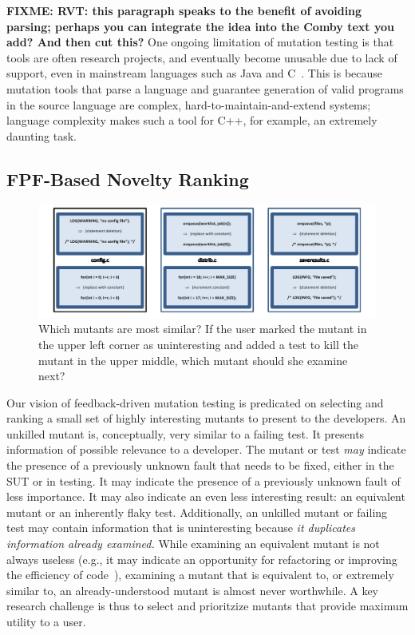 \textbf{FIXME: RVT: this paragraph speaks to the benefit of avoiding parsing;
  perhaps you can integrate the idea into the Comby text you add? And then cut this?} 
One ongoing limitation of mutation testing is that tools are often research
projects, and eventually become unusable due to lack of support, even in
mainstream languages such as Java and C~\cite{MutChoice}.
This is because mutation tools that parse a language and guarantee generation of
valid programs in the source language are complex, hard-to-maintain-and-extend
systems; language complexity makes such a tool for C++, for example, an
extremely daunting task.   

\subsection{FPF-Based Novelty Ranking}
\label{sec:fpfplan}

\begin{figure}[t]
\centering
\includegraphics[width=0.95\columnwidth]{distmetric}

\caption{Which mutants are most similar?  If the user marked the
  mutant in the upper left corner as uninteresting and added a test
  to kill the
  mutant in the upper middle, which mutant
  should she examine next?}
\label{fig:distances}
\end{figure}


Our vision of feedback-driven mutation testing is predicated on selecting and ranking a small
set of highly interesting mutants to present to the developers.  An unkilled
mutant is, conceptually, very similar to a failing test.  It presents
information of possible relevance to a developer.  The mutant or test \emph{may}
indicate the presence of a previously unknown fault that needs to be fixed,
either in the SUT or in testing.  It may indicate the presence of a previously
unknown fault of less importance.  It may also indicate an even less interesting
result: an equivalent mutant or an inherently flaky test.  Additionally, an
unkilled mutant or failing test may contain information that is uninteresting
because \emph{it duplicates information already examined.}  While examining an
equivalent mutant is not always useless (e.g., it may indicate an opportunity
for refactoring or improving the efficiency of
code~\cite{ivankovic2018industrial,groce2018verified}), examining a mutant that
is equivalent to, or extremely similar to, an already-understood mutant is
almost never worthwhile.  A key research challenge is thus to select and
prioritzize mutants that provide maximum utility to a user.  

